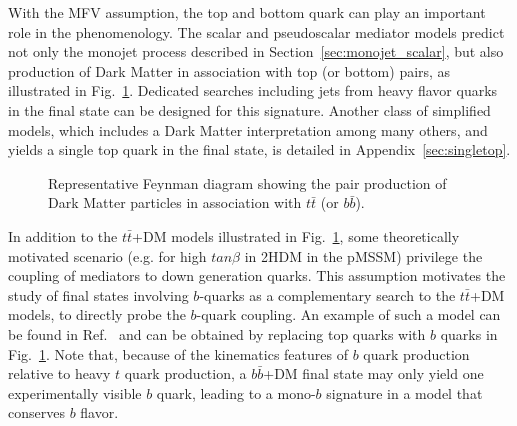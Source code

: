 With the MFV assumption, the top and bottom
quark can play an important  role in the phenomenology.
The scalar and pseudoscalar mediator models predict not only
the monojet process described in Section~\ref{sec:monojet_scalar}, but also production of Dark Matter
in association with top (or bottom) pairs, as illustrated in Fig.~\ref{fig:TTbarPhi}. 
Dedicated searches including jets from heavy flavor quarks in the final state
can be designed for this signature. Another class of simplified models,  
which includes a Dark Matter interpretation among many others, and yields a single
top quark in the final state, is detailed in Appendix~\ref{sec:singletop}. 

\begin{figure}[htbp!]
\centering
\vspace{0.5\baselineskip}
  \textwidth
  \begin{feynmandiagram}[modelTTbarMET]
  \end{feynmandiagram}
\vspace{0.5\baselineskip}
\caption{Representative Feynman
diagram showing the pair production of Dark Matter particles in
association with $t\bar t$ (or $b\bar b$).}
\label{fig:TTbarPhi}
\end{figure}

In addition to the $t\bar t$+DM models illustrated in Fig.~\ref{fig:TTbarPhi}, 
some theoretically motivated scenario (e.g. for high $tan\beta$ in 2HDM in the pMSSM) 
privilege the coupling of \spinzero mediators to down generation quarks.
This assumption motivates the study of final states involving $b$-quarks 
as a complementary search to the $t\bar
t$+DM models, to directly probe the $b$-quark coupling. 
An example of such a model can be found in Ref.~\cite{Buckley:2014fba}
and can be obtained by replacing top quarks with $b$ quarks in Fig.~\ref{fig:TTbarPhi}.
Note that, because of the kinematics features of $b$ quark production relative
to heavy $t$ quark production, a $b\bar b$+DM final state may only yield one
experimentally visible $b$ quark, leading to a mono-$b$ signature in a model that conserves $b$ flavor.

